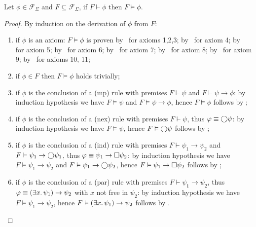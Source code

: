 \begin{theorem}[Soundness]
  Let $\phi \in \mathcal{F}_\Sigma$ and $F \subseteq \mathcal{F}_\Sigma$, if $F \vdash \phi$ then $F \vDash \phi$.
\end{theorem}
\begin{proof}
  By induction on the derivation of $\phi$ from $F$:
  \begin{enumerate}
    \item if $\phi$ is an axiom: $F \vDash \phi$ is proven by~ for axioms 1,2,3;
      by~ for axiom 4; by~ for axiom 5; by~ for axiom 6;
      by~ for axiom 7; by~ for axiom 8; by~ for axiom 9;
      by~ for axioms 10, 11;
    \item if $\phi \in F$ then $F \vDash \phi$ holds trivially;
    \item if $\phi$ is the conclusion of a (mp) rule with premises $F \vdash \psi$ and $F \vdash \psi \to \phi$: by
      induction hypothesis we have $F \vDash \psi$ and $F \vDash \psi \to \phi$, hence $F \vDash \phi$ follows by
      ;
    \item if $\phi$ is the conclusion of a (nex) rule with premises $F \vdash \psi$, thus $\varphi \equiv \bigcirc{\psi}$: by
      induction hypothesis we have $F \vDash \psi$, hence $F \vDash \bigcirc{\psi}$ follows by ;
    \item if $\phi$ is the conclusion of a (ind) rule with premises $F \vdash \psi_1 \to \psi_2$ and $F \vdash \psi_1
      \to \bigcirc{\psi_1}$, thus $\varphi \equiv \psi_1 \to \Box{\psi_2}$: by induction hypothesis we have $F \vDash
      \psi_1 \to \psi_2$ and $F \vDash \psi_1 \to \bigcirc{\psi_2}$, hence $F \vDash \psi_1 \to \Box{\psi_2}$ follows
      by ;
    \item if $\phi$ is the conclusion of a (par) rule with premises $F \vdash \psi_1 \to \psi_2$, thus $\varphi \equiv
      (\exists {x} \ldotp {\psi_1}) \to \psi_2$ with $x$ not free in $\psi_2$: by induction hypothesis we have $F \vDash \psi_1
      \to \psi_2$, hence $F \vDash (\exists {x} \ldotp {\psi_1}) \to \psi_2$ follows by .
  \end{enumerate}
\end{proof}


